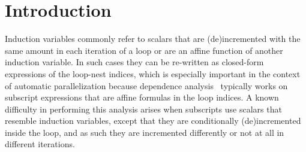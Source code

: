 \documentclass{sig-alternate}
\begin{document}





\section{Introduction}


\enlargethispage{\baselineskip}

Induction variables commonly refer to scalars that are (de)incremented with
the same amount in each iteration of a loop or are an affine function of
another induction variable. In such cases they can be re-written as 
closed-form expressions of the loop-nest indices, which is especially 
important in the context of automatic parallelization because dependence 
analysis~\cite{BanerjeeIneqTest,FeautrierDataflow,Pugh92theomega}
typically works on subscript expressions that are affine formulas in the 
loop indices.
%
A known difficulty in performing this analysis arises when subscripts 
use scalars that resemble induction variables, except that they are 
conditionally (de)incremented inside the loop, and as such they are incremented differently or not
at all in different iterations.


\end{document}
